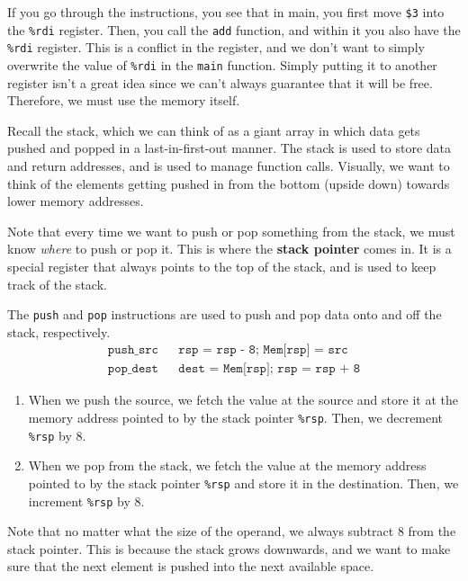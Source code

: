 \documentclass{article}
\begin{document}
      If you go through the instructions, you see that in main, you first move \texttt{\$3} into the \texttt{\%rdi} register. Then, you call the \texttt{add} function, and within it you also have the \texttt{\%rdi} register. This is a conflict in the register, and we don't want to simply overwrite the value of \texttt{\%rdi} in the \texttt{main} function. Simply putting it to another register isn't a great idea since we can't always guarantee that it will be free. Therefore, we must use the memory itself. 

      Recall the stack, which we can think of as a giant array in which data gets pushed and popped in a last-in-first-out manner. The stack is used to store data and return addresses, and is used to manage function calls. Visually, we want to think of the elements getting pushed in from the bottom (upside down) towards lower memory addresses. 

      \begin{definition}
        Note that every time we want to push or pop something from the stack, we must know \textit{where} to push or pop it. This is where the \textbf{stack pointer} comes in. It is a special register that always points to the top of the stack, and is used to keep track of the stack.
      \end{definition}

      \begin{definition}
        The \texttt{push} and \texttt{pop} instructions are used to push and pop data onto and off the stack, respectively. 
        \begin{align*}
          \texttt{push\_ src} && \texttt{rsp = rsp - 8; Mem[rsp] = src} \\
          \texttt{pop\_ dest} && \texttt{dest = Mem[rsp]; rsp = rsp + 8} 
        \end{align*}
        \begin{enumerate}
          \item When we push the source, we fetch the value at the source and store it at the memory address pointed to by the stack pointer \texttt{\%rsp}. Then, we decrement \texttt{\%rsp} by 8.
          \item When we pop from the stack, we fetch the value at the memory address pointed to by the stack pointer \texttt{\%rsp} and store it in the destination. Then, we increment \texttt{\%rsp} by 8.
        \end{enumerate}
        Note that no matter what the size of the operand, we always subtract 8 from the stack pointer. This is because the stack grows downwards, and we want to make sure that the next element is pushed into the next available space.
      \end{definition}
\end{document}
